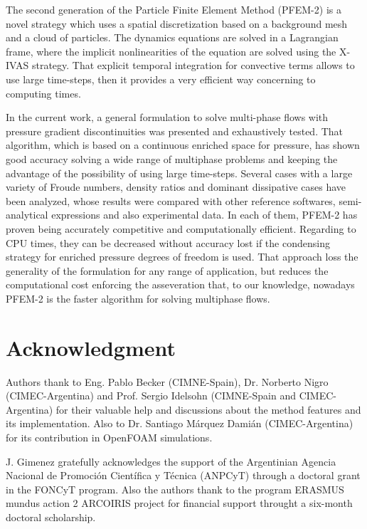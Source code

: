 \documentclass[review]{elsarticle}
\begin{document}
The second generation of the Particle Finite Element Method (PFEM-2) is a novel strategy which uses a spatial discretization based on a background mesh and a cloud of particles. The dynamics equations are solved in a Lagrangian frame, where the implicit nonlinearities of the equation are solved using the X-IVAS strategy. That explicit temporal integration for convective terms allows to use large time-steps, then it provides a very efficient way concerning to computing times.

In the current work, a general formulation to solve multi-phase flows with pressure gradient discontinuities was presented and exhaustively tested. That algorithm, which is based on a continuous enriched space for pressure, has shown good accuracy solving a wide range of multiphase problems and keeping the advantage of the possibility of using large time-steps. Several cases with a large variety of Froude numbers, density ratios and dominant dissipative cases have been analyzed, whose results were compared with other reference softwares, semi-analytical expressions and also experimental data. In each of them, PFEM-2 has proven being accurately competitive and computationally efficient. Regarding to CPU times, they can be decreased without accuracy lost if the condensing strategy for enriched pressure degrees of freedom is used. That approach loss the generality of the formulation for any range of application, but reduces the computational cost enforcing the asseveration that, to our knowledge, nowadays PFEM-2 is the faster algorithm for solving multiphase flows.
 
\section*{Acknowledgment}

Authors thank to Eng. Pablo Becker (CIMNE-Spain), Dr. Norberto Nigro (CIMEC-Argentina) and Prof. Sergio Idelsohn (CIMNE-Spain and CIMEC-Argentina) for their valuable help and discussions about the method features and its implementation. Also to Dr. Santiago M\'arquez Dami\'an (CIMEC-Argentina) for its contribution in OpenFOAM simulations.

J. Gimenez gratefully acknowledges the support of the Argentinian Agencia Nacional de Promoci\'on Cient\'ifica y T\' ecnica (ANPCyT) through a doctoral grant in the FONCyT program. Also the authors thank to the program ERASMUS mundus action 2 ARCOIRIS project for financial support throught a six-month doctoral scholarship.
\end{document}
